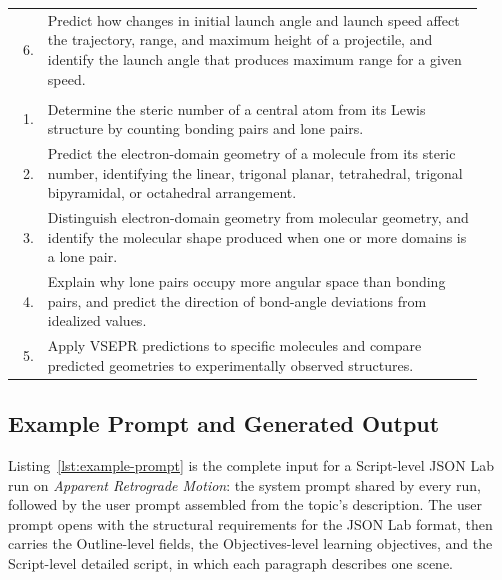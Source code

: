 {\begin{longtable}{@{} r p{0.93\linewidth} @{}}
    6. & Predict how changes in initial launch angle and launch speed affect the trajectory, range, and maximum height of a projectile, and identify the launch angle that produces maximum range for a given speed. \\
    \addlinespace[6pt]
    \multicolumn{2}{@{}l}{\textbf{VSEPR Molecular Geometry}} \\
    1. & Determine the steric number of a central atom from its Lewis structure by counting bonding pairs and lone pairs. \\
    2. & Predict the electron-domain geometry of a molecule from its steric number, identifying the linear, trigonal planar, tetrahedral, trigonal bipyramidal, or octahedral arrangement. \\
    3. & Distinguish electron-domain geometry from molecular geometry, and identify the molecular shape produced when one or more domains is a lone pair. \\
    4. & Explain why lone pairs occupy more angular space than bonding pairs, and predict the direction of bond-angle deviations from idealized values. \\
    5. & Apply VSEPR predictions to specific molecules and compare predicted geometries to experimentally observed structures. \\
\end{longtable}
}

\subsection{Example Prompt and Generated Output}
\label{app:example-pair}

Listing~\ref{lst:example-prompt} is the complete input for a Script-level JSON
Lab run on \emph{Apparent Retrograde Motion}: the system prompt shared by
every run, followed by the user prompt assembled from the topic's
description. The user prompt opens with the structural requirements for the
JSON Lab format, then carries the Outline-level fields, the Objectives-level
learning objectives, and the Script-level detailed script, in which each paragraph
describes one scene.

